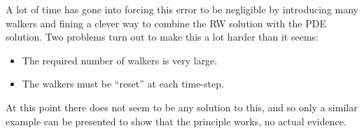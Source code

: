 A lot of time has gone into forcing this error to be negligible by introducing many walkers and fining a clever way to combine the RW solution with the PDE solution. 
Two problems turn out to make this a lot harder than it seems:
\begin{itemize}
 \item The required number of walkers is very large. 
 \item The walkers must be ``reset'' at each time-step.
\end{itemize}
At this point there does not seem to be any solution to this, and so only a similar example can be presented to show that the principle works, no actual evidence.

% 

